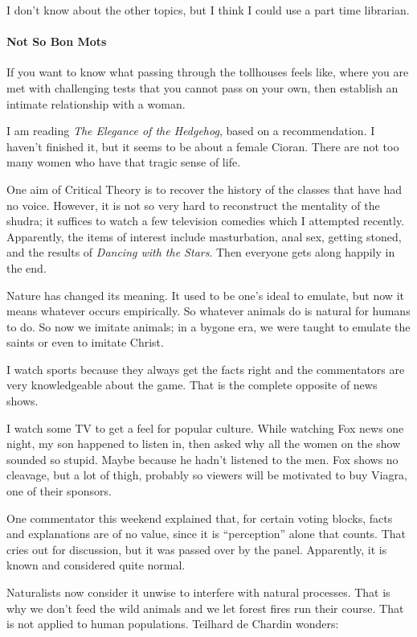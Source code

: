 I don't know about the other topics, but I think I could use a part time librarian.

\paragraph{Not So Bon Mots}


If you want to know what passing through the tollhouses feels like, where you are met with challenging tests that you cannot pass on your own, then establish an intimate relationship with a woman.

I am reading \emph{The Elegance of the Hedgehog}, based on a recommendation. I haven't finished it, but it seems to be about a female Cioran. There are not too many women who have that tragic sense of life.

One aim of Critical Theory is to recover the history of the classes that have had no voice. However, it is not so very hard to reconstruct the mentality of the shudra; it suffices to watch a few television comedies which I attempted recently. Apparently, the items of interest include masturbation, anal sex, getting stoned, and the results of \emph{Dancing with the Stars}. Then everyone gets along happily in the end.

Nature has changed its meaning. It used to be one's ideal to emulate, but now it means whatever occurs empirically. So whatever animals do is natural for humans to do. So now we imitate animals; in a bygone era, we were taught to emulate the saints or even to imitate Christ.

I watch sports because they always get the facts right and the commentators are very knowledgeable about the game. That is the complete opposite of news shows.

I watch some TV to get a feel for popular culture. While watching Fox news one night, my son happened to listen in, then asked why all the women on the show sounded so stupid. Maybe because he hadn't listened to the men. Fox shows no cleavage, but a lot of thigh, probably so viewers will be motivated to buy Viagra, one of their sponsors.

One commentator this weekend explained that, for certain voting blocks, facts and explanations are of no value, since it is ``perception'' alone that counts. That cries out for discussion, but it was passed over by the panel. Apparently, it is known and considered quite normal.

Naturalists now consider it unwise to interfere with natural processes. That is why we don't feed the wild animals and we let forest fires run their course. That is not applied to human populations. Teilhard de Chardin wonders:

